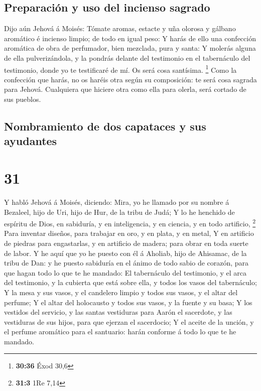 \hypertarget{preparaciuxf3n-y-uso-del-incienso-sagrado}{%
\subsection{Preparación y uso del incienso
sagrado}\label{preparaciuxf3n-y-uso-del-incienso-sagrado}}

 Dijo aún Jehová á Moisés: Tómate aromas, estacte y uña
olorosa y gálbano aromático é incienso limpio; de todo en igual peso:
 Y harás de ello una confección aromática de obra de
perfumador, bien mezclada, pura y santa:  Y molerás
alguna de ella pulverizándola, y la pondrás delante del testimonio en el
tabernáculo del testimonio, donde yo te testificaré de mí. Os será cosa
santísima. \footnote{\textbf{30:36} Éxod 30,6}  Como la
confección que harás, no os haréis otra según su composición: te será
cosa sagrada para Jehová.  Cualquiera que hiciere otra
como ella para olerla, será cortado de sus pueblos.

\hypertarget{nombramiento-de-dos-capataces-y-sus-ayudantes}{%
\subsection{Nombramiento de dos capataces y sus
ayudantes}\label{nombramiento-de-dos-capataces-y-sus-ayudantes}}

\hypertarget{section-30}{%
\section{31}\label{section-30}}

 Y habló Jehová á Moisés, diciendo:  Mira,
yo he llamado por su nombre á Bezaleel, hijo de Uri, hijo de Hur, de la
tribu de Judá;  Y lo he henchido de espíritu de Dios, en
sabiduría, y en inteligencia, y en ciencia, y en todo artificio,
\footnote{\textbf{31:3} 1Re 7,14}  Para inventar diseños,
para trabajar en oro, y en plata, y en metal,  Y en
artificio de piedras para engastarlas, y en artificio de madera; para
obrar en toda suerte de labor.  Y he aquí que yo he puesto
con él á Aholiab, hijo de Ahisamac, de la tribu de Dan: y he puesto
sabiduría en el ánimo de todo sabio de corazón, para que hagan todo lo
que te he mandado:  El tabernáculo del testimonio, y el
arca del testimonio, y la cubierta que está sobre ella, y todos los
vasos del tabernáculo;  Y la mesa y sus vasos, y el
candelero limpio y todos sus vasos, y el altar del perfume;
 Y el altar del holocausto y todos sus vasos, y la fuente
y su basa;  Y los vestidos del servicio, y las santas
vestiduras para Aarón el sacerdote, y las vestiduras de sus hijos, para
que ejerzan el sacerdocio;  Y el aceite de la unción, y
el perfume aromático para el santuario: harán conforme á todo lo que te
he mandado.

